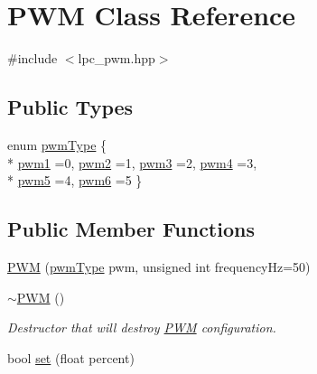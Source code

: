 \hypertarget{classPWM}{}\section{P\+WM Class Reference}
\label{classPWM}


{\ttfamily \#include $<$lpc\+\_\+pwm.\+hpp$>$}

\subsection*{Public Types}
\begin{DoxyCompactItemize}
\item 
enum \hyperlink{classPWM_a4a7c14d2027c2cc508d4ff7abfe79ae7}{pwm\+Type} \{ \\*
\hyperlink{classPWM_a4a7c14d2027c2cc508d4ff7abfe79ae7ae9204765ea1148a6e9e5ae736dd5125c}{pwm1} =0, 
\hyperlink{classPWM_a4a7c14d2027c2cc508d4ff7abfe79ae7a6915379c35fd961109595bfc851e881c}{pwm2} =1, 
\hyperlink{classPWM_a4a7c14d2027c2cc508d4ff7abfe79ae7aa24887ef4639816c895fc2b9636a3df5}{pwm3} =2, 
\hyperlink{classPWM_a4a7c14d2027c2cc508d4ff7abfe79ae7a700468106205ca486064cdfe85b7a48a}{pwm4} =3, 
\\*
\hyperlink{classPWM_a4a7c14d2027c2cc508d4ff7abfe79ae7a6292df88727966ee9ee6236750ea985e}{pwm5} =4, 
\hyperlink{classPWM_a4a7c14d2027c2cc508d4ff7abfe79ae7aa08486b79f7e12af820716dff6c00465}{pwm6} =5
 \}
\end{DoxyCompactItemize}
\subsection*{Public Member Functions}
\begin{DoxyCompactItemize}
\item 
\hyperlink{classPWM_a0ace6fd5ae366113bcffba8972e394dc}{P\+WM} (\hyperlink{classPWM_a4a7c14d2027c2cc508d4ff7abfe79ae7}{pwm\+Type} pwm, unsigned int frequency\+Hz=50)
\item 
\hyperlink{classPWM_a903377c1da3618530f999d77297406af}{$\sim$\+P\+WM} ()
\begin{DoxyCompactList}\small\item\em Destructor that will destroy \hyperlink{classPWM}{P\+WM} configuration. \end{DoxyCompactList}\item 
bool \hyperlink{classPWM_a441dfa585452ddd6f8f47b661bafddb2}{set} (float percent)
\end{DoxyCompactItemize}


